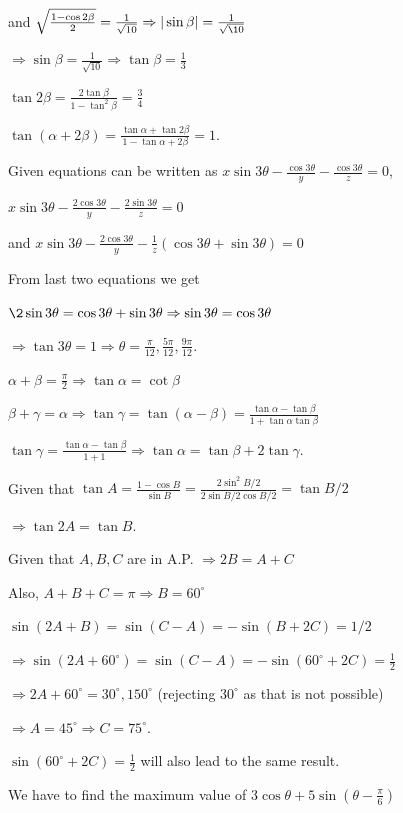   and $\sqrt{\frac{1 - \cos2\beta}{2}} = \frac{1}{\sqrt{10}}\Rightarrow |\sin\beta| = \frac{1}{\sqrt{\10}}$

  $\Rightarrow \sin\beta = \frac{1}{\sqrt{10}}\Rightarrow \tan\beta = \frac{1}{3}$

  $\tan2\beta = \frac{2\tan\beta}{1 - \tan^2\beta} = \frac{3}{4}$

  $\tan(\alpha + 2\beta) = \frac{\tan\alpha + \tan2\beta}{1 - \tan\alpha + 2\beta} = 1$.
\item Given equations can be written as $x\sin3\theta - \frac{\cos3\theta}{y} - \frac{\cos3\theta}{z} = 0$,

  $x\sin3\theta - \frac{2\cos3\theta}{y} - \frac{2\sin3\theta}{z} = 0$

  and $x\sin3\theta - \frac{2\cos3\theta}{y} - \frac{1}{z}(\cos3\theta + \sin3\theta) = 0$

  From last two equations we get

  $\2\sin3\theta = \cos3\theta + \sin3\theta \Rightarrow \sin3\theta = \cos3\theta$

  $\Rightarrow \tan3\theta = 1 \Rightarrow \theta = \frac{\pi}{12}, \frac{5\pi}{12}, \frac{9\pi}{12}$.
\item $\alpha + \beta = \frac{\pi}{2}\Rightarrow \tan\alpha = \cot\beta$

  $\beta + \gamma = \alpha \Rightarrow \tan\gamma = \tan(\alpha - \beta) = \frac{\tan\alpha - \tan\beta}{1 +
  \tan\alpha\tan\beta}$

  $\tan\gamma = \frac{\tan\alpha - \tan\beta}{1 + 1}\Rightarrow \tan\alpha = \tan\beta + 2\tan\gamma$.
\item Given that $\tan A = \frac{1 - \cos B}{\sin B} = \frac{2\sin^2B/2}{2\sin B/2\cos B/2} = \tan B/2$

  $\Rightarrow \tan2A = \tan B$.
\item Given that $A, B, C$ are in A.P. $\Rightarrow 2B = A + C$

  Also, $A + B + C = \pi \Rightarrow B = 60^\circ$

  $\sin(2A + B) = \sin(C - A) = -\sin(B + 2C) = 1/2$

  $\Rightarrow \sin\left(2A + 60^\circ\right) = \sin(C - A) = -\sin\left(60^\circ + 2C\right) = \frac{1}{2}$

  $\Rightarrow 2A + 60^\circ = 30^\circ, 150^\circ$ (rejecting $30^\circ$ as that is not possible)

  $\Rightarrow A = 45^\circ \Rightarrow C = 75^\circ$.

  $\sin(60^\circ + 2C) = \frac{1}{2}$ will also lead to the same result.
\item We have to find the maximum value of $3\cos\theta + 5\sin\left(\theta - \frac{\pi}{6}\right)$

